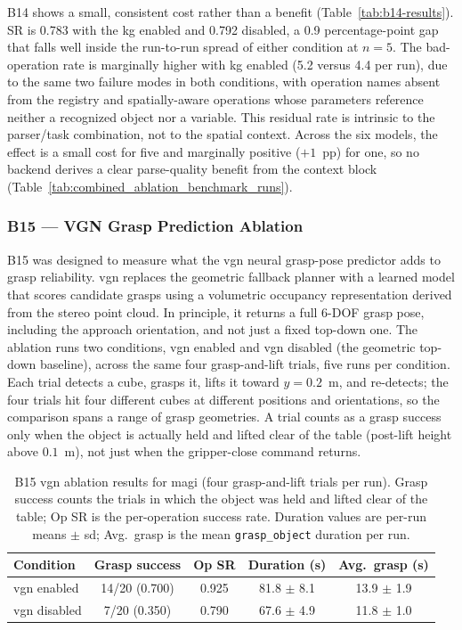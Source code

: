 B14 shows a small, consistent cost rather than a benefit (Table~\ref{tab:b14-results}). SR is 0.783 with the \gls{kg} enabled and 0.792 disabled, a 0.9 percentage-point gap that falls well inside the run-to-run spread of either condition at $n=5$. The bad-operation rate is marginally higher with \gls{kg} enabled (5.2 versus 4.4 per run), due to the same two failure modes in both conditions, with operation names absent from the registry and spatially-aware operations whose parameters reference neither a recognized object nor a variable. This residual rate is intrinsic to the parser/task combination, not to the spatial context. Across the six models, the effect is a small cost for five and marginally positive ($+1$~pp) for one, so no backend derives a clear parse-quality benefit from the context block (Table~\ref{tab:combined_ablation_benchmark_runs}).

\subsubsection{B15 — VGN Grasp Prediction Ablation}\label{sec:results-vgn}
B15 was designed to measure what the \gls{vgn} neural grasp-pose predictor adds to grasp reliability. \gls{vgn} replaces the geometric fallback planner with a learned model that scores candidate grasps using a volumetric occupancy representation derived from the stereo point cloud. In principle, it returns a full 6-DOF grasp pose, including the approach orientation, and not just a fixed top-down one. The ablation runs two conditions, \gls{vgn} enabled and \gls{vgn} disabled (the geometric top-down baseline), across the same four grasp-and-lift trials, five runs per condition. Each trial detects a cube, grasps it, lifts it toward $y = 0.2$~m, and re-detects; the four trials hit four different cubes at different positions and orientations, so the comparison spans a range of grasp geometries. A trial counts as a grasp success only when the object is actually held and lifted clear of the table (post-lift height above $0.1$~m), not just when the gripper-close command returns.

\begin{table}[t]
	\centering
	\begin{tabular}{lcccc}
		\hline
		\textbf{Condition} & \textbf{Grasp success} &
		\textbf{Op SR}     & \textbf{Duration (s)}  & \textbf{Avg.\ grasp (s)}                                   \\
		\hline
		\gls{vgn} enabled  & 14/20 (0.700)          & 0.925                    & 81.8 $\pm$ 8.1 & 13.9 $\pm$ 1.9 \\
		\gls{vgn} disabled & 7/20 (0.350)           & 0.790                    & 67.6 $\pm$ 4.9 & 11.8 $\pm$ 1.0 \\
		\hline
	\end{tabular}
	\caption{B15 \gls{vgn} ablation results for \gls{magi} (four grasp-and-lift trials per run). Grasp success counts the trials in which the object was held and lifted clear of the table; Op SR is the per-operation success rate. Duration values are per-run means $\pm$ \gls{sd}; Avg.\ grasp is the mean \texttt{grasp\_object} duration per run.}
	\label{tab:b15-results}
\end{table}

